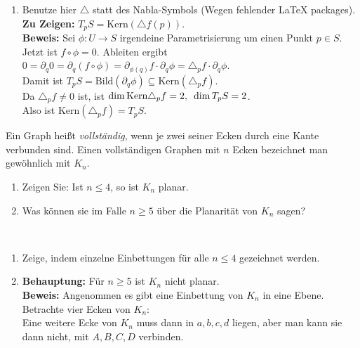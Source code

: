 \begin{solution}
\begin{enumerate}[label=(\alph*)]
      \item Benutze hier \( \triangle \) statt des Nabla-Symbols (Wegen fehlender LaTeX packages). \\
      \textbf{Zu Zeigen:} \( T_p S = \text{Kern}(\triangle f(p)) \). \\
      \textbf{Beweis:} Sei \( \phi: U \to S \) irgendeine Parametrisierung um einen Punkt \( p \in S \). \\
      Jetzt ist \( f \circ \phi = 0 \). Ableiten ergibt \\
      \( 0 = \partial_q 0 = \partial_q (f \circ \phi) = \partial_{\phi(q)}f \cdot \partial_q \phi = \triangle_p f \cdot \partial_q \phi \). \\
      Damit ist \( T_p S = \text{Bild}(\partial_q \phi) \subseteq \text{Kern}(\triangle_p f) \). \\
      Da \( \triangle_p f \neq 0 \) ist, ist \( \dim\text{Kern} \triangle_p f = 2\text{,}\enskip \dim T_p S = 2 \). \\
      Also ist \( \text{Kern}(\triangle_p f) = T_pS \).
  \end{enumerate}
\end{solution}
\begin{assignment}
 Ein Graph heißt \emph{vollständig}, wenn je zwei seiner Ecken durch eine Kante verbunden sind. Einen vollständigen Graphen mit $ n $ Ecken bezeichnet man gewöhnlich mit $ K_n $.
 \begin{enumerate}[label=(\alph*)] 
    \item Zeigen Sie: Ist $ n \leq 4$, so ist $K_n$ planar.
    \item Was können sie im Falle $n \geq 5$ über die Planarität von $K_n$ sagen?
 \end{enumerate}
\end{assignment}
\begin{solution}
\
  \begin{enumerate}[label=(\alph*)] 
      \item Zeige, indem einzelne Einbettungen für alle \( n \leq 4 \) gezeichnet werden. \\
      \item \textbf{Behauptung:} Für \( n \geq 5 \) ist \( K_n \) nicht planar. \\
            \textbf{Beweis:} Angenommen es gibt eine Einbettung von \( K_n \) in eine Ebene. Betrachte vier Ecken von \( K_n \): \\ 
            Eine weitere Ecke von \( K_n \) muss dann in \( a,b,c,d \) liegen, aber man kann sie dann nicht, mit \( A, B, C, D \) verbinden.
    \end{enumerate}  
\end{solution}

